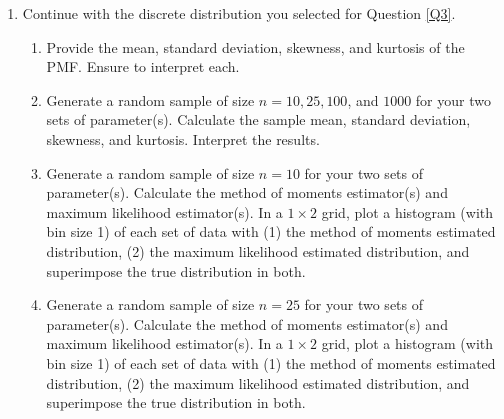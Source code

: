 \documentclass{article}\usepackage[]{graphicx}\usepackage[]{color}
\begin{document}
\begin{enumerate}
\item Continue with the discrete distribution you selected for Question \ref{Q3}.
\begin{enumerate}
  \item Provide the mean, standard deviation, skewness, and kurtosis of the PMF. 
  Ensure to interpret each.
  \item Generate a random sample of size $n=10, 25, 100$, and $1000$ for your 
  two sets of parameter(s). Calculate the sample mean, standard deviation, 
  skewness, and kurtosis. Interpret the results.
  \item Generate a random sample of size $n=10$ for your two sets of parameter(s).
  Calculate the method of moments estimator(s) and maximum likelihood estimator(s).
  In a $1 \times 2$ grid, plot a histogram (with bin size 1) of each set of data 
  with (1) the method of moments estimated distribution, (2) the maximum likelihood 
  estimated distribution, and superimpose the true distribution in both.
  \item Generate a random sample of size $n=25$ for your two sets of parameter(s). 
  Calculate the method of moments estimator(s) and maximum likelihood estimator(s).
  In a $1 \times 2$ grid, plot a histogram (with bin size 1) of each set of data 
  with (1) the method of moments estimated distribution, (2) the maximum likelihood 
  estimated distribution, and superimpose the true distribution in both.

\end{enumerate}
\end{enumerate}
\end{document}
